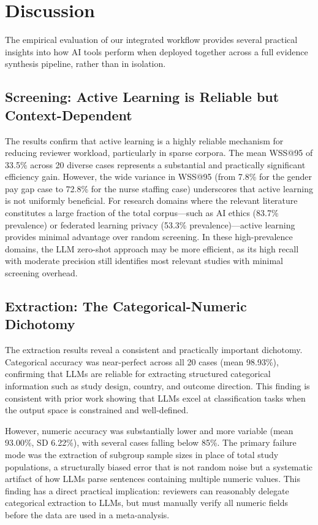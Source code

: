 \documentclass[12pt]{article}
\begin{document}
\section{Discussion}

The empirical evaluation of our integrated workflow provides several practical insights into how AI tools perform when deployed together across a full evidence synthesis pipeline, rather than in isolation.

\subsection{Screening: Active Learning is Reliable but Context-Dependent}

The results confirm that active learning is a highly reliable mechanism for reducing reviewer workload, particularly in sparse corpora. The mean WSS@95 of 33.5\% across 20 diverse cases represents a substantial and practically significant efficiency gain. However, the wide variance in WSS@95 (from 7.8\% for the gender pay gap case to 72.8\% for the nurse staffing case) underscores that active learning is not uniformly beneficial. For research domains where the relevant literature constitutes a large fraction of the total corpus---such as AI ethics (83.7\% prevalence) or federated learning privacy (53.3\% prevalence)---active learning provides minimal advantage over random screening. In these high-prevalence domains, the LLM zero-shot approach may be more efficient, as its high recall with moderate precision still identifies most relevant studies with minimal screening overhead.

\subsection{Extraction: The Categorical-Numeric Dichotomy}

The extraction results reveal a consistent and practically important dichotomy. Categorical accuracy was near-perfect across all 20 cases (mean 98.93\%), confirming that LLMs are reliable for extracting structured categorical information such as study design, country, and outcome direction. This finding is consistent with prior work showing that LLMs excel at classification tasks when the output space is constrained and well-defined.

However, numeric accuracy was substantially lower and more variable (mean 93.00\%, SD 6.22\%), with several cases falling below 85\%. The primary failure mode was the extraction of subgroup sample sizes in place of total study populations, a structurally biased error that is not random noise but a systematic artifact of how LLMs parse sentences containing multiple numeric values. This finding has a direct practical implication: reviewers can reasonably delegate categorical extraction to LLMs, but must manually verify all numeric fields before the data are used in a meta-analysis.
\end{document}
